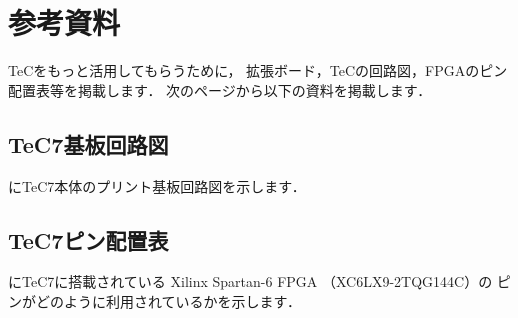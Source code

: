 \renewcommand{\myincludegraphics}[2]{\texttt{[image: appD/\#1]}}

\newpage
\onecolumn
\chapter{参考資料}

TeCをもっと活用してもらうために，
拡張ボード，TeCの回路図，FPGAのピン配置表等を掲載します．
次のページから以下の資料を掲載します．

\section{TeC7基板回路図}
にTeC7本体のプリント基板回路図を示します．

\section{TeC7ピン配置表}
にTeC7に搭載されている
Xilinx Spartan-6 FPGA （XC6LX9-2TQG144C）の
ピンがどのように利用されているかを示します．

\newpage
{}

\newpage
{}
